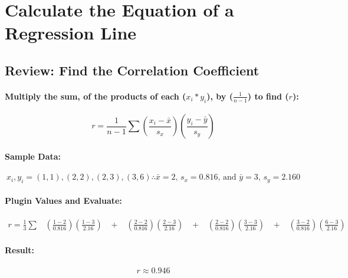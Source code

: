 \documentclass[12pt]{article}
\begin{document}
\section*{Calculate the Equation of a Regression Line}

\subsection{Review: Find the Correlation Coefficient}
\paragraph{Multiply the sum, of the products of each ($x_{i} * y_{i}$), by ($\frac{1}{n-1}$) to find ($r$):}

\begin{equation}
	r = \frac{1}{n - 1}\sum
	\left(\frac{x_{i} - \bar{x}}{s_{x}}\right)
	\left(\frac{y_{i} - \bar{y}}{s_{y}}\right)
\end{equation}%

\paragraph{Sample Data:}
\begin{equation}
	x_{i}, y_{i} = (1, 1), (2, 2), (2, 3), (3, 6) \therefore
	\bar{x} = 2\text{, }s_{x} = 0.816 \text{, and }
	\bar{y} = 3 \text{, }s_{y} = 2.160
\end{equation}

\paragraph{Plugin Values and Evaluate:}

\begin{equation}
\begin{gathered}
		r = \frac{1}{3}\sum \;\;\;%
		\left(\frac{1 - 2}{0.816}\right)\left(\frac{1 - 3}{2.16}\right) \;\;\;%
		+ \;\;\;%
		\left(\frac{2 - 2}{0.816}\right)\left(\frac{2 - 3}{2.16}\right) \;\;\;%
		+ \;\;\;%
		\left(\frac{2 - 2}{0.816}\right)\left(\frac{3 - 3}{2.16}\right) \;\;\;%
		+ \;\;\;%
		\left(\frac{3 - 2}{0.816}\right)\left(\frac{6 - 3}{2.16}\right) \;\;\;%
\end{gathered}%
\end{equation}%

\paragraph{Result:}
\begin{equation}r \approx 0.946\end{equation}
\end{document}
